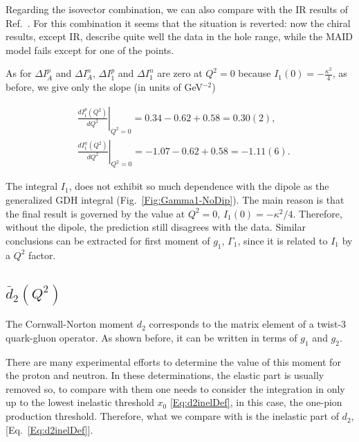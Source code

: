 \documentclass[prc,twocolumn,showpacs,preprintnumbers,amsmath,amssymb
,superscriptaddress,a4paper,nofootinbib
]{revtex4-1}
\begin{document}
Regarding the isovector combination, we can also compare with the IR results of Ref.~\cite{Bernard:2002pw}. 
For this combination it seems that the situation is reverted: now the chiral results, except IR, describe quite well the data in the hole range, while the MAID model fails except for one of the points.


As for $\Delta I_A^p$ and $\Delta I_A^n$, $\Delta I_1^p$ and $\Delta I_1^n$ are zero at $Q^2=0$ because $I_1 (0) = - \frac{\kappa^2}{4}$, as before, we give only the slope (in units of GeV$^{-2}$)

\begin{align}
&\left.\frac{dI_1^p (Q^2)}{dQ^2}\right|_{Q^2=0}= 0.34 - 0.62 + 0.58  = 0.30(2),\\
&\left.\frac{dI_1^n (Q^2)}{dQ^2}\right|_{Q^2=0}= -1.07 - 0.62 + 0.58 = -1.11(6).
\end{align}



The integral $I_1$, does not exhibit so much dependence with the dipole as the generalized GDH integral (Fig.~\ref{Fig:Gamma1-NoDip}). 
The main reason is that the final result is governed by the value at $Q^2=0$, $I_1(0)=-\kappa^2/4$. 
Therefore, without the dipole, the prediction still disagrees with the data.
Similar conclusions can be extracted for first moment of $g_1$, $\Gamma_1$, since it is related to $I_1$ by a $Q^2$ factor.


\subsection{$\bar{d}_2(Q^2)$}

The Cornwall-Norton moment $d_2$ corresponds to the matrix element of a twist-3 quark-gluon operator. 
As shown before, it can be written in terms of $g_1$ and $g_2$.
%


There are many experimental efforts to determine the value of this moment for the proton and neutron.
In these determinations, the elastic part is usually removed so, to compare with them one needs to consider the integration in only up to the lowest inelastic threshold $x_0$ \eqref{Eq:d2inelDef}, in this case, the one-pion production threshold.
Therefore, what we compare with is the inelastic part of $d_2$, [Eq.~\eqref{Eq:d2inelDef}].
\end{document}
